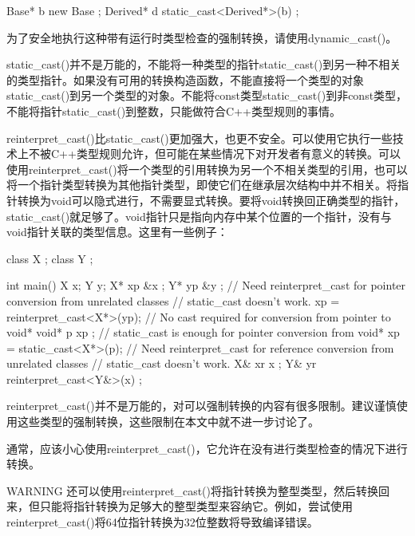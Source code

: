 \begin{cpp}
Base* b { new Base {} };
Derived* d { static_cast<Derived*>(b) };
\end{cpp}

为了安全地执行这种带有运行时类型检查的强制转换，请使用dynamic\_cast()。

static\_cast()并不是万能的，不能将一种类型的指针static\_cast()到另一种不相关的类型指针。如果没有可用的转换构造函数，不能直接将一个类型的对象static\_cast()到另一个类型的对象。不能将const类型static\_cast()到非const类型，不能将指针static\_cast()到整数，只能做符合C++类型规则的事情。


reinterpret\_cast()比static\_cast()更加强大，也更不安全。可以使用它执行一些技术上不被C++类型规则允许，但可能在某些情况下对开发者有意义的转换。可以使用reinterpret\_cast()将一个类型的引用转换为另一个不相关类型的引用，也可以将一个指针类型转换为其他指针类型，即使它们在继承层次结构中并不相关。将指针转换为void可以隐式进行，不需要显式转换。要将void转换回正确类型的指针，static\_cast()就足够了。void指针只是指向内存中某个位置的一个指针，没有与void指针关联的类型信息。这里有一些例子：

\begin{cpp}
class X {};
class Y {};

int main()
{
    X x;
    Y y;
    X* xp { &x };
    Y* yp { &y };
    // Need reinterpret_cast for pointer conversion from unrelated classes
    // static_cast doesn't work.
    xp = reinterpret_cast<X*>(yp);
    // No cast required for conversion from pointer to void*
    void* p { xp };
    // static_cast is enough for pointer conversion from void*
    xp = static_cast<X*>(p);
    // Need reinterpret_cast for reference conversion from unrelated classes
    // static_cast doesn't work.
    X& xr { x };
    Y& yr { reinterpret_cast<Y&>(x) };
}
\end{cpp}

reinterpret\_cast()并不是万能的，对可以强制转换的内容有很多限制。建议谨慎使用这些类型的强制转换，这些限制在本文中就不进一步讨论了。

通常，应该小心使用reinterpret\_cast()，它允许在没有进行类型检查的情况下进行转换。

\begin{myWarning}{WARNING}
还可以使用reinterpret\_cast()将指针转换为整型类型，然后转换回来，但只能将指针转换为足够大的整型类型来容纳它。例如，尝试使用reinterpret\_cast()将64位指针转换为32位整数将导致编译错误。
\end{myWarning}

